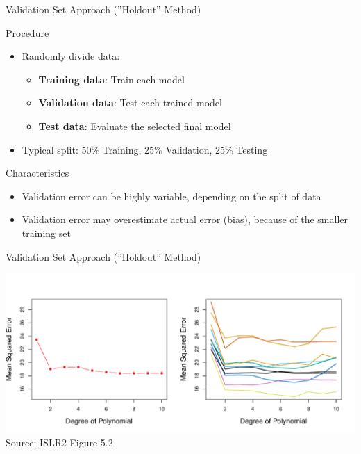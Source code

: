 \documentclass[ignorenonframetext,xcolor=x11names]{beamer}
\begin{document}
\begin{frame}{Validation Set Approach (''Holdout'' Method)}
\begin{block}{Procedure}
\begin{itemize}
\item Randomly divide data:
\begin{itemize}
   \item \textbf{Training data}: Train each model
   \item \textbf{Validation data}: Test each trained model
   \item \textbf{Test data}: Evaluate the selected final model
\end{itemize}
\item Typical split: 50\% Training, 25\% Validation, 25\% Testing
\end{itemize}
\end{block}

\begin{block}{Characteristics}
\begin{itemize} 
  \item Validation error can be highly variable, depending on the split of data
  \item Validation error may overestimate actual error (bias), because of the smaller training set
\end{itemize}
\end{block}
\end{frame}

\begin{frame}{Validation Set Approach (''Holdout'' Method)}
\centering 

\includegraphics[width=\textwidth]{Figures_Chapters_1-6/Chapter5/5_2.pdf}
\scriptsize Source: ISLR2 Figure 5.2
\end{frame}
\end{document}
